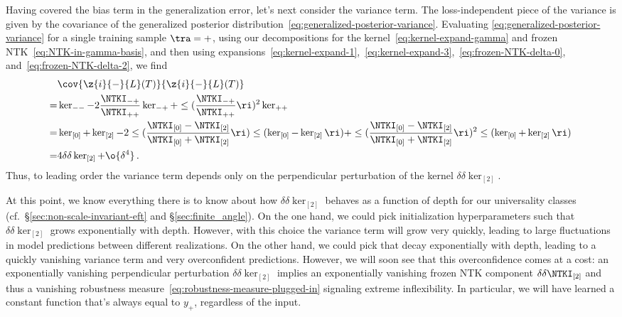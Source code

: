 Having covered the bias term in the generalization error, let's next consider the variance term. The loss-independent piece of the variance
is given by the covariance of the generalized posterior distribution~\eqref{eq:generalized-posterior-variance}.
Evaluating \eqref{eq:generalized-posterior-variance} for a single training sample $\tra=+$, using our decompositions for the kernel~\eqref{eq:kernel-expand-gamma} and frozen NTK~\eqref{eq:NTK-in-gamma-basis}, and then using expansions~\eqref{eq:kernel-expand-1},~\eqref{eq:kernel-expand-3},~\eqref{eq:frozen-NTK-delta-0}, and~\eqref{eq:frozen-NTK-delta-2}, we find
\begin{align}\label{eq:generalization-variance-expanded}
&\cov{\z{i}{-}{L}(T) }{ \z{i}{-}{L}(T)}\, \\
=&\ker_{--}-2\frac{\NTKI_{-+}}{\NTKI_{++}}\ker_{-+}+\le(\frac{\NTKI_{-+}}{\NTKI_{++}}\ri)^2\ker_{++}\, \notag\\
=&\ker_{[0]}+\ker_{[2]}-2\le(\frac{\NTKI_{[0]}-\NTKI_{[2]}}{\NTKI_{[0]}+\NTKI_{[2]}}\ri)\le(\ker_{[0]}-\ker_{[2]}\ri)+\le(\frac{\NTKI_{[0]}-\NTKI_{[2]}}{\NTKI_{[0]}+\NTKI_{[2]}}\ri)^2\le(\ker_{[0]}+\ker_{[2]}\ri)\, \notag\\
=&4\delta\delta\ker_{[2]}+\o{\delta^4}\, .\notag
\end{align}
Thus, to leading order the variance term depends only on the perpendicular perturbation of the kernel $\delta\delta\ker_{[2]}$.



At this point, we know everything there is to know about how $\delta\delta\ker_{[2]}$ behaves as a function of depth for our universality classes (cf.~\S\ref{sec:non-scale-invariant-eft} and \S\ref{sec:finite_angle}). On the one hand, we could pick initialization hyperparameters such that $\delta\delta\ker_{[2]}$ grows exponentially with depth. However, with this choice the variance term will grow very quickly, leading to large fluctuations in model predictions between different realizations. On the other hand, we could pick  that decay exponentially with depth, leading to a quickly vanishing variance term and very overconfident predictions. However, we will soon see that this overconfidence comes at a cost: an exponentially vanishing perpendicular perturbation $\delta\delta\ker_{[2]}$ implies an exponentially vanishing frozen NTK component $\delta\delta\NTKI_{[2]}$ and thus a vanishing robustness measure~\eqref{eq:robustness-measure-plugged-in} signaling extreme inflexibility. In particular, we will have learned a constant function that's always equal to $y_+$, regardless of the input.

